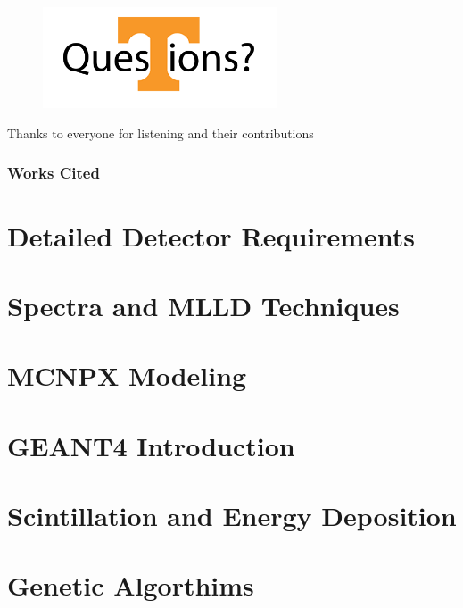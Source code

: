 \documentclass[compress]{beamer}
\begin{document}
\begin{frame}{}
  \centering
  \begin{figure}
    \includegraphics[height=3cm]{PowerTQuestion.png}
  \end{figure}
  Thanks to everyone for listening and their contributions
\end{frame}
\begin{frame}
\frametitle{Works Cited}
	\tiny
\end{frame}
\appendix
\section*{Detailed Detector Requirements}
\label{PNNLCriteria}

\section*{Spectra and MLLD Techniques}
\label{MeasMethods}

\section*{MCNPX Modeling}
\label{MCNPXMethodExtended}

\section*{GEANT4 Introduction}
\label{G4Intro}

\section*{Scintillation and Energy Deposition}
\label{ScintEnergyDep}

\section*{Genetic Algorthims}
\label{GAMethodExtended}

\end{document}
